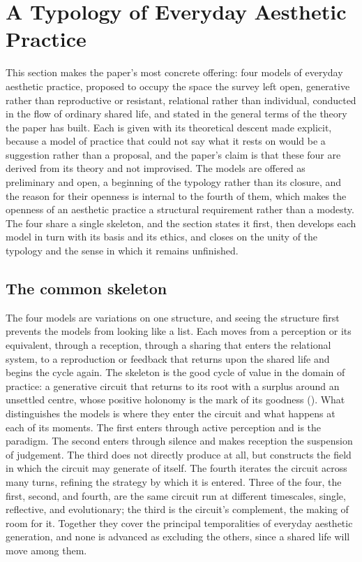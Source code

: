 \section{A Typology of Everyday Aesthetic Practice}
\label{p23:sec:typology}

\noindent
This section makes the paper's most concrete offering: four models of everyday aesthetic practice, proposed to occupy the space the survey left open, generative rather than reproductive or resistant, relational rather than individual, conducted in the flow of ordinary shared life, and stated in the general terms of the theory the paper has built. Each is given with its theoretical descent made explicit, because a model of practice that could not say what it rests on would be a suggestion rather than a proposal, and the paper's claim is that these four are derived from its theory and not improvised. The models are offered as preliminary and open, a beginning of the typology rather than its closure, and the reason for their openness is internal to the fourth of them, which makes the openness of an aesthetic practice a structural requirement rather than a modesty. The four share a single skeleton, and the section states it first, then develops each model in turn with its basis and its ethics, and closes on the unity of the typology and the sense in which it remains unfinished.

\subsection{The common skeleton}
\label{p23:sub:typ-skeleton}

The four models are variations on one structure, and seeing the structure first prevents the models from looking like a list. Each moves from a perception or its equivalent, through a reception, through a sharing that enters the relational system, to a reproduction or feedback that returns upon the shared life and begins the cycle again. The skeleton is the good cycle of value in the domain of practice: a generative circuit that returns to its root with a surplus around an unsettled centre, whose positive holonomy is the mark of its goodness (). What distinguishes the models is where they enter the circuit and what happens at each of its moments. The first enters through active perception and is the paradigm. The second enters through silence and makes reception the suspension of judgement. The third does not directly produce at all, but constructs the field in which the circuit may generate of itself. The fourth iterates the circuit across many turns, refining the strategy by which it is entered. Three of the four, the first, second, and fourth, are the same circuit run at different timescales, single, reflective, and evolutionary; the third is the circuit's complement, the making of room for it. Together they cover the principal temporalities of everyday aesthetic generation, and none is advanced as excluding the others, since a shared life will move among them.

